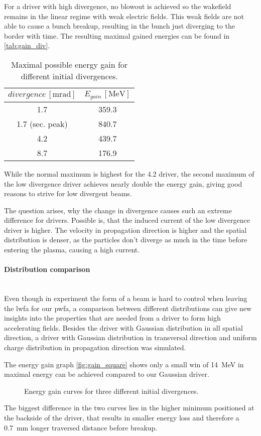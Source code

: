 \documentclass[bachelor_thesis]{subfiles}
\begin{document}
For a driver with high divergence, no blowout is achieved so the wakefield remains in the linear regime with weak electric fields. This weak fields are not able to cause a bunch breakup, resulting in the bunch just diverging to the border with time.
The resulting maximal gained energies can be found in \autoref{tab:gain_div}.
\begin{table}[h]
\begin{center}
\begin{tabular}{|c|c|} 
	\hline
 	$divergence \, \mathrm{[mrad]}$ & $E_{gain} \, \mathrm{[MeV]}$ \\ 
 	\hline
	1.7 & 359.3 \\ 
	1.7 (sec. peak) & 840.7 \\ 
 	4.2 & 439.7 \\
	8.7 & 176.9 \\
	\hline
\end{tabular}
\caption{Maximal possible energy gain for different initial divergences.}\label{tab:gain_div}
\end{center}
\end{table}
While the normal maximum is highest for the \qty{4.2}{\mrad} driver, the second maximum of the low divergence driver achieves nearly double the energy gain, giving good reasons to strive for low divergent beams.
 
The question arises, why the change in divergence causes such an extreme difference for drivers. Possible is, that the induced current of the low divergence driver is higher. The velocity in propagation direction is higher and the spatial distribution
is denser, as the particles don't diverge as much in the time before entering the plasma, causing a high current. 


\paragraph*{Distribution comparison}\hspace{0pt} \\
Even though in experiment the form of a beam is hard to control when leaving the \gls{lwfa} for our \gls{pwfa}, a comparison between different distributions can give new insights into the properties that are needed from a driver
to form high accelerating fields. Besides the driver with Gaussian distribution in all spatial direction, a driver with Gaussian distribution in transversal direction and uniform charge distribution in propagation direction 
was simulated.

The energy gain graph \autoref{fig:gain_square} shows only a small win of \qty{14}{\MeV} in maximal energy can be achieved compared to our Gaussian driver.
\begin{figure}
	\centering
	\missingfigure{}
	\caption{Energy gain curves for three different initial divergences.}
	\label{fig:gain_square}
\end{figure}
The biggest difference in the two curves lies in the higher minimum positioned at the backside of the driver, that results in smaller energy loss and therefore a \qty{0.7}{mm} longer traversed distance before breakup.
\end{document}
